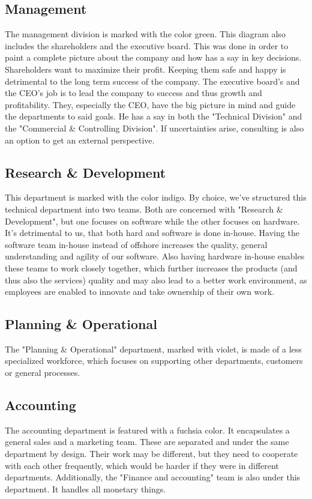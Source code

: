 \subsection{Management}\label{org-management}
The management division is marked with the color green. This diagram also includes the shareholders and the executive board. This was done in order to paint a complete picture about the company and how has a say in key decisions.
\newline
Shareholders want to maximize their profit. Keeping them safe and happy is detrimental to the long term success of the company.
\newline
The executive board's and the CEO's job is to lead the company to success and thus growth and profitability. They, especially the CEO, have the big picture in mind and guide the departments to said goals. He has a say in both the "Technical Division" and the "Commercial \& Controlling Division".
\newline
\newline
If uncertainties arise, consulting is also an option to get an external perspective.
\subsection{Research \& Development}\label{org-rnd}
This department is marked with the color indigo.
\newline
By choice, we've structured this technical department into two teams. Both are concerned with "Research \& Development", but one focuses on software while the other focuses on hardware. It's detrimental to us, that both hard and software is done in-house. Having the software team in-house instead of offshore increases the quality, general understanding and agility of our software. Also having hardware in-house enables these teams to work closely together, which further increases the products (and thus also the services) quality and may also lead to a better work environment, as employees are enabled to innovate and take ownership of their own work. \cite{wang_2022_employee}
\subsection{Planning \& Operational}
The "Planning \& Operational" department, marked with violet, is made of a less specialized workforce, which focuses on supporting other departments, customers or general processes.
\subsection{Accounting}
The accounting department is featured with a fuchsia color. It encapsulates a general sales and a marketing team. These are separated and under the same department by design. Their work may be different, but they need to cooperate with each other frequently, which would be harder if they were in different departments.
Additionally, the "Finance and accounting" team is also under this department. It handles all monetary things.
